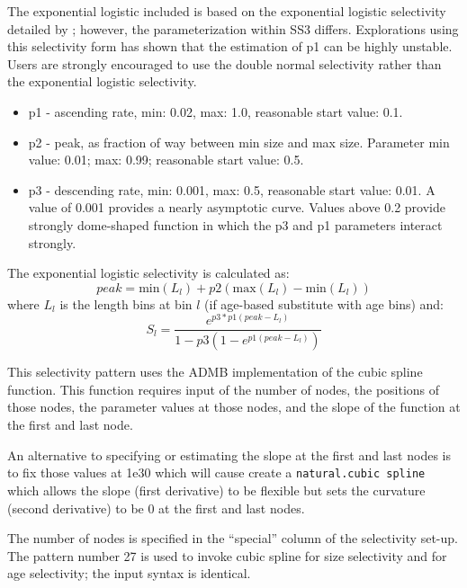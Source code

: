 \hypertarget{ExponentialLogistic}{}
The exponential logistic included is based on the exponential logistic selectivity detailed by \citet{thompson-confounding-1994}; however, the parameterization within SS3 differs. Explorations using this selectivity form has shown that the estimation of p1 can be highly unstable. Users are strongly encouraged to use the double normal selectivity rather than the exponential logistic selectivity.
	\begin{itemize}
		\item p1 - ascending rate, min: 0.02, max: 1.0, reasonable start value: 0.1.
		\item p2 - peak, as fraction of way between min size and max size. Parameter min value: 0.01; max: 0.99; reasonable start value: 0.5.
		\item p3 - descending rate, min: 0.001, max: 0.5, reasonable start value: 0.01. A value of 0.001 provides a nearly asymptotic curve. Values above 0.2 provide strongly dome-shaped function in which the p3 and p1 parameters interact strongly.
	\end{itemize}

The exponential logistic selectivity is calculated as:
	\begin{equation}
	peak = \text{min}(L_l) + p2(\text{max}(L_l) - \text{min}(L_l) )
	\end{equation}
where $L_l$ is the length bins at bin $l$ (if age-based substitute with age bins) and:
	\begin{equation}
	S_l = \frac{e^{p3*p1(peak-L_l)}}{1-p3(1-e^{p1(peak- L_l)})}
	\end{equation}

\hypertarget{cubic-spline}{}
This selectivity pattern uses the ADMB implementation of the cubic spline
function. This function requires input of the number of nodes, the positions
of those nodes, the parameter values at those nodes, and the slope of the
function at the first and last node.

An alternative to specifying or estimating the slope at the first and last
nodes is to fix those values at 1e30 which will cause create a \texttt{natural.cubic spline} 
which allows the slope (first derivative) to be flexible but
sets the curvature (second derivative) to be 0 at the first and last nodes.

The number of nodes is specified in the ``special'' column of the selectivity
set-up. The pattern number 27 is used to invoke cubic spline for size
selectivity and for age selectivity; the input syntax is identical.
	
